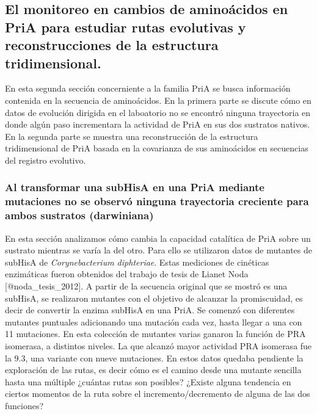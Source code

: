 \documentclass[]{article}
\begin{document}
{\subsection{El monitoreo en cambios de aminoácidos en PriA para estudiar
rutas evolutivas y reconstrucciones de la estructura
tridimensional.}\label{el-monitoreo-en-cambios-de-aminoacidos-en-pria-para-estudiar-rutas-evolutivas-y-reconstrucciones-de-la-estructura-tridimensional.}

En esta segunda sección concerniente a la familia PriA se busca
información contenida en la secuencia de aminoácidos. En la primera
parte se discute cómo en datos de evolución dirigida en el laboatorio no
se encontró ninguna trayectoria en donde algún paso incrementara la
actividad de PriA en sus dos sustratos nativos. En la segunda parte se
muestra una reconstrucción de la estructura tridimensional de PriA
basada en la covarianza de sus aminoácidos en secuencias del registro
evolutivo.

\subsubsection{Al transformar una subHisA en una PriA mediante
mutaciones no se observó ninguna trayectoria creciente para ambos
sustratos
(darwiniana)}\label{al-transformar-una-subhisa-en-una-pria-mediante-mutaciones-no-se-observo-ninguna-trayectoria-creciente-para-ambos-sustratos-darwiniana}

En esta sección analizamos cómo cambia la capacidad catalítica de PriA
sobre un sustrato mientras se varía la del otro. Para ello se utilizaron
datos de mutantes de subHisA de \emph{Corynebacterium diphteriae}. Estas
mediciones de cinéticas enzimáticas fueron obtenidos del trabajo de
tesis de Lianet Noda {[}@noda\_tesis\_2012{]}. A partir de la secuencia
original que se mostró es una subHisA, se realizaron mutantes con el
objetivo de alcanzar la promiscuidad, es decir de convertir la enzima
subHisA en una PriA. Se comenzó con diferentes mutantes puntuales
adicionando una mutación cada vez, hasta llegar a una con 11 mutaciones.
En esta colección de mutantes varias ganaron la función de PRA
isomerasa, a distintos niveles. La que alcanzó mayor actividad PRA
isomerasa fue la \(9.3\), una variante con nueve mutaciones. En estos
datos quedaba pendiente la exploración de las rutas, es decir cómo es el
camino desde una mutante sencilla hasta una múltiple ¿cuántas rutas son
posibles? ¿Existe alguna tendencia en ciertos momentos de la ruta sobre
el incremento/decremento de alguna de las dos funciones?

}
\end{document}
